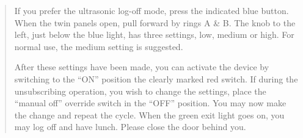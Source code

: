 \documentclass[a4paper]{report}
\begin{document}
\begin{appendix}
\begin{quotation}
If you prefer the ultrasonic log-off mode, press the indicated blue
button. When the twin panels open, pull forward by rings A \& B. The
knob to the left, just below the blue light, has three settings, low,
medium or high. For normal use, the medium setting is suggested.

After these settings have been made, you can activate the device by
switching to the ``ON'' position the clearly marked red switch. If
during the unsubscribing operation, you wish to change the settings,
place the ``manual off'' override switch in the ``OFF'' position. You
may now make the change and repeat the cycle. When the green exit
light goes on, you may log off and have lunch. Please close the door
behind you.
\end{quotation}

\end{appendix}

%
%
 \printindex

%
%
\end{document}
